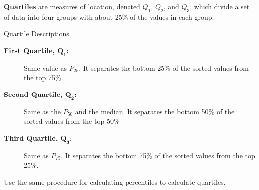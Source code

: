 \documentclass[handout]{beamer}
\begin{document}
\begin{frame}
\begin{definition}
\textbf{Quartiles} are measures of location, denoted $Q_1$, $Q_2$, and $Q_3$, which divide a set of data into four groups with about 25\% of the values in each group.
\end{definition}\pause

\begin{block}{Quartile Descriptions}
\begin{description}
\item[\textbf{First Quartile, $\boldsymbol{Q_1}$:}] Same value as $P_{25}$. It separates the bottom 25\% of the sorted values from the top 75\%.\pause
\item[\textbf{Second Quartile, $\boldsymbol{Q_2}$:}] Same as the $P_{50}$ and the median. It separates the bottom 50\% of the sorted values from the top 50\%\pause
\item[\textbf{Third Quartile, $\boldsymbol{Q_3}$}:] Same as $P_{75}$. It separates the bottom 75\% of the sorted values from the top 25\%.
\end{description}
\end{block}\pause

\begin{note}
Use the same procedure for calculating percentiles to calculate quartiles.
\end{note}
\end{frame}
\end{document}
